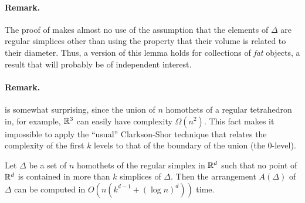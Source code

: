 \documentclass{llncs}
\begin{document}
\paragraph{Remark.} The proof of  makes almost no use
of the assumption that the elements of $\Delta$ are regular simplices other
than using the property that their volume is related to their diameter.
Thus, a version of this lemma holds for collections of \emph{fat} objects,
a result that will probably be of independent interest.

\paragraph{Remark.}  is somewhat surprising, since the
union of $n$ homothets of a regular tetrahedron in, for example, $\mathbb{R}^3$ can
easily have complexity $\Omega(n^2)$.  This fact makes it impossible to
apply the ``usual'' Clarkson-Shor technique \cite{cs89} that relates the
complexity of the first $k$ levels to that of the boundary of the union
(the 0-level).

\begin{lem}
  Let $\Delta$ be a set of $n$ homothets of the regular simplex in
  $\mathbb{R}^d$ such that no point of $\mathbb{R}^d$ is contained in more than $k$
  simplices of $\Delta$.  Then the arrangement $A(\Delta)$ of $\Delta$
  can be computed in $O(n(k^{d-1}+(\log n)^{d}))$ time.
\end{lem}
\end{document}

